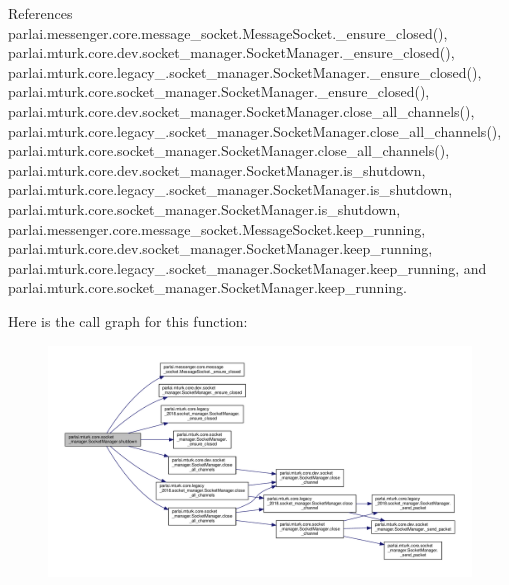 References parlai.\+messenger.\+core.\+message\+\_\+socket.\+Message\+Socket.\+\_\+ensure\+\_\+closed(), parlai.\+mturk.\+core.\+dev.\+socket\+\_\+manager.\+Socket\+Manager.\+\_\+ensure\+\_\+closed(), parlai.\+mturk.\+core.\+legacy\+\_.\+socket\+\_\+manager.\+Socket\+Manager.\+\_\+ensure\+\_\+closed(), parlai.\+mturk.\+core.\+socket\+\_\+manager.\+Socket\+Manager.\+\_\+ensure\+\_\+closed(), parlai.\+mturk.\+core.\+dev.\+socket\+\_\+manager.\+Socket\+Manager.\+close\+\_\+all\+\_\+channels(), parlai.\+mturk.\+core.\+legacy\+\_.\+socket\+\_\+manager.\+Socket\+Manager.\+close\+\_\+all\+\_\+channels(), parlai.\+mturk.\+core.\+socket\+\_\+manager.\+Socket\+Manager.\+close\+\_\+all\+\_\+channels(), parlai.\+mturk.\+core.\+dev.\+socket\+\_\+manager.\+Socket\+Manager.\+is\+\_\+shutdown, parlai.\+mturk.\+core.\+legacy\+\_.\+socket\+\_\+manager.\+Socket\+Manager.\+is\+\_\+shutdown, parlai.\+mturk.\+core.\+socket\+\_\+manager.\+Socket\+Manager.\+is\+\_\+shutdown, parlai.\+messenger.\+core.\+message\+\_\+socket.\+Message\+Socket.\+keep\+\_\+running, parlai.\+mturk.\+core.\+dev.\+socket\+\_\+manager.\+Socket\+Manager.\+keep\+\_\+running, parlai.\+mturk.\+core.\+legacy\+\_.\+socket\+\_\+manager.\+Socket\+Manager.\+keep\+\_\+running, and parlai.\+mturk.\+core.\+socket\+\_\+manager.\+Socket\+Manager.\+keep\+\_\+running.

Here is the call graph for this function\+:
\nopagebreak
\begin{figure}[H]
\begin{center}
\leavevmode
\includegraphics[width=350pt]{classparlai_1_1mturk_1_1core_1_1socket__manager_1_1SocketManager_ac98d9330dbc0bcfad53a7a66c09fb56a_cgraph}
\end{center}
\end{figure}
\mbox{\label{classparlai_1_1mturk_1_1core_1_1socket__manager_1_1SocketManager_a895934ce725c0770e94ff6ba0842078e}} 
